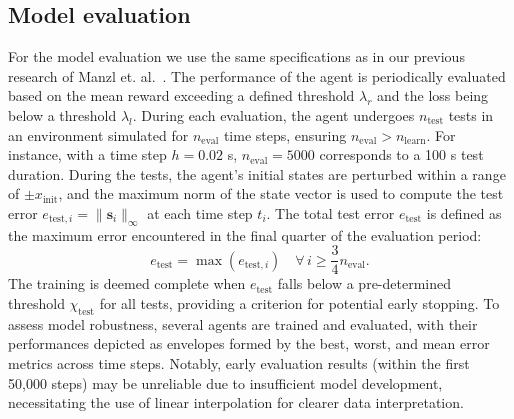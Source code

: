 \subsection{Model evaluation} \label{Model evaluation}




For the model evaluation we use the same specifications as in our previous research of Manzl et. al.~\cite{manzl2023relrl}. The performance of the agent is periodically evaluated based on the mean reward exceeding a defined threshold \( \lambda_r \) and the loss being below a threshold \( \lambda_l \). During each evaluation, the agent undergoes \( n_{\text{test}} \) tests in an environment simulated for \( n_{\text{eval}} \) time steps, ensuring \( n_{\text{eval}} > n_{\text{learn}} \). For instance, with a time step \( h = 0.02 \) s, \( n_{\text{eval}} = 5000 \) corresponds to a 100 s test duration. During the tests, the agent's initial states are perturbed within a range of \( \pm x_{\text{init}} \), and the maximum norm of the state vector is used to compute the test error \( e_{\text{test},i} = \|\mathbf{s}_i\|_{\infty} \) at each time step \( t_i \). The total test error \( e_{\text{test}} \) is defined as the maximum error encountered in the final quarter of the evaluation period:
\begin{equation}
	e_{\text{test}} = \max(e_{\text{test},i}) \quad \forall \, i \geq \frac{3}{4}n_{\text{eval}}.
\end{equation}
The training is deemed complete when \( e_{\text{test}} \) falls below a pre-determined threshold \( \chi_{\text{test}} \) for all tests, providing a criterion for potential early stopping. To assess model robustness, several agents are trained and evaluated, with their performances depicted as envelopes formed by the best, worst, and mean error metrics across time steps. Notably, early evaluation results (within the first 50,000 steps) may be unreliable due to insufficient model development, necessitating the use of linear interpolation for clearer data interpretation.


